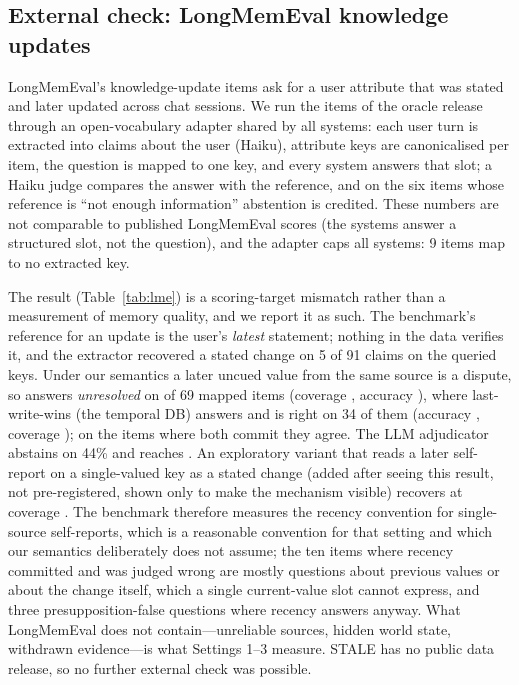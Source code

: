 \subsection{External check: LongMemEval knowledge updates}

LongMemEval's knowledge-update items \citep{longmemeval} ask for a user attribute that was stated and later updated across chat sessions. We run the \lmeN{} items of the oracle release through an open-vocabulary adapter shared by all systems: each user turn is extracted into claims about the user (Haiku), attribute keys are canonicalised per item, the question is mapped to one key, and every system answers that slot; a Haiku judge compares the answer with the reference, and on the six items whose reference is ``not enough information'' abstention is credited. These numbers are not comparable to published LongMemEval scores (the systems answer a structured slot, not the question), and the adapter caps all systems: 9 items map to no extracted key.

The result (Table~\ref{tab:lme}) is a scoring-target mismatch rather than a measurement of memory quality, and we report it as such. The benchmark's reference for an update is the user's \emph{latest} statement; nothing in the data verifies it, and the extractor recovered a stated change on 5 of 91 claims on the queried keys. Under our semantics a later uncued value from the same source is a dispute, so \pal{} answers \emph{unresolved} on \lmePalUnres{} of 69 mapped items (coverage \lmePalCov, accuracy \lmePalAcc), where last-write-wins (the temporal DB) answers and is right on 34 of them (accuracy \lmeTdbAcc, coverage \lmeTdbCov); on the items where both commit they agree. The LLM adjudicator abstains on 44\% and reaches \lmeLogAcc. An exploratory variant that reads a later self-report on a single-valued key as a stated change (added after seeing this result, not pre-registered, shown only to make the mechanism visible) recovers \lmePalSuAcc{} at coverage \lmePalSuCov. The benchmark therefore measures the recency convention for single-source self-reports, which is a reasonable convention for that setting and which our semantics deliberately does not assume; the ten items where recency committed and was judged wrong are mostly questions about previous values or about the change itself, which a single current-value slot cannot express, and three presupposition-false questions where recency answers anyway. What LongMemEval does not contain---unreliable sources, hidden world state, withdrawn evidence---is what Settings 1--3 measure. STALE has no public data release, so no further external check was possible.

